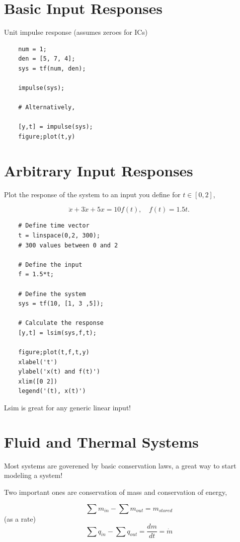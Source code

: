\documentclass[12pt, a4paper]{report}
\begin{document}
  \section{Basic Input Responses}

  Unit impulse response (assumes zeroes for ICs)

  \begin{lstlisting}
    num = 1;
    den = [5, 7, 4];
    sys = tf(num, den);

    impulse(sys);

    # Alternatively,

    [y,t] = impulse(sys);
    figure;plot(t,y)
  \end{lstlisting}

  \section{Arbitrary Input Responses}

  Plot the response of the system to an input you define for $ t \in [0, 2] $,

  \[
      \ddot x + 3\dot x + 5x = 10f(t), \quad f(t) = 1.5t
    .\]

  \begin{lstlisting}
    # Define time vector
    t = linspace(0,2, 300);
    # 300 values between 0 and 2

    # Define the input
    f = 1.5*t;

    # Define the system
    sys = tf(10, [1, 3 ,5]);

    # Calculate the response
    [y,t] = lsim(sys,f,t);

    figure;plot(t,f,t,y)
    xlabel('t')
    ylabel('x(t) and f(t)')
    xlim([0 2])
    legend('(t), x(t)')
  \end{lstlisting}

  Lsim is great for any generic linear input!

  \section{Fluid and Thermal Systems}

  Most systems are goverened by basic conservation laws, a great way to start modeling a system!

  Two important ones are conservation of mass and conservation of energy,

  \begin{equation}
    \sum m_{in} - \sum m_{out} = m_{stored}
  \end{equation}
  (as a rate)
  \begin{equation}
    \sum q_{in} - \sum q_{out} = \frac{dm}{dt} = \dot m
  \end{equation}
\end{document}
